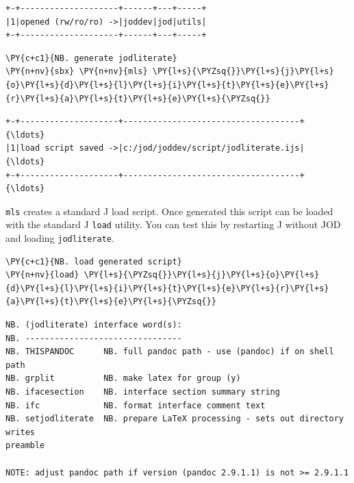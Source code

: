     \begin{Verbatim}[commandchars=\\\{\}]
+-+--------------------+------+---+-----+
|1|opened (rw/ro/ro) ->|joddev|jod|utils|
+-+--------------------+------+---+-----+
    \end{Verbatim}

    \begin{tcolorbox}[breakable, size=fbox, boxrule=1pt, pad at break*=1mm,colback=cellbackground, colframe=cellborder]
\begin{Verbatim}[commandchars=\\\{\}]
\PY{c+c1}{NB. generate jodliterate}
\PY{n+nv}{sbx} \PY{n+nv}{mls} \PY{l+s}{\PYZsq{}}\PY{l+s}{j}\PY{l+s}{o}\PY{l+s}{d}\PY{l+s}{l}\PY{l+s}{i}\PY{l+s}{t}\PY{l+s}{e}\PY{l+s}{r}\PY{l+s}{a}\PY{l+s}{t}\PY{l+s}{e}\PY{l+s}{\PYZsq{}}
\end{Verbatim}
\end{tcolorbox}

    \begin{Verbatim}[commandchars=\\\{\}]
+-+--------------------+------------------------------------+               {\ldots}
|1|load script saved ->|c:/jod/joddev/script/jodliterate.ijs|               {\ldots}
+-+--------------------+------------------------------------+               {\ldots}
    \end{Verbatim}

    \texttt{mls} creates a standard J load script. Once generated this
script can be loaded with the standard J \texttt{load} utility. You can
test this by restarting J without JOD and loading \texttt{jodliterate}.

    \begin{tcolorbox}[breakable, size=fbox, boxrule=1pt, pad at break*=1mm,colback=cellbackground, colframe=cellborder]
\begin{Verbatim}[commandchars=\\\{\}]
\PY{c+c1}{NB. load generated script}
\PY{n+nv}{load} \PY{l+s}{\PYZsq{}}\PY{l+s}{j}\PY{l+s}{o}\PY{l+s}{d}\PY{l+s}{l}\PY{l+s}{i}\PY{l+s}{t}\PY{l+s}{e}\PY{l+s}{r}\PY{l+s}{a}\PY{l+s}{t}\PY{l+s}{e}\PY{l+s}{\PYZsq{}}
\end{Verbatim}
\end{tcolorbox}

    \begin{Verbatim}[commandchars=\\\{\}]
NB. (jodliterate) interface word(s):
NB. --------------------------------
NB. THISPANDOC      NB. full pandoc path - use (pandoc) if on shell path
NB. grplit          NB. make latex for group (y)
NB. ifacesection    NB. interface section summary string
NB. ifc             NB. format interface comment text
NB. setjodliterate  NB. prepare LaTeX processing - sets out directory writes
preamble

NOTE: adjust pandoc path if version (pandoc 2.9.1.1) is not >= 2.9.1.1
    \end{Verbatim}

